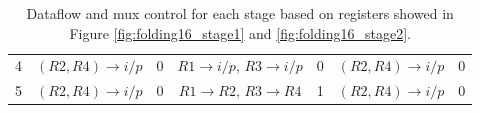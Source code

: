 \begin{table*}
{\begin{tabular}{c||c|c||c|c||c|c}
        \multirow{2}{*}{4}  &  \multirow{2}{*}{$(R2,R4) \to i/p$} & \multirow{2}{*}{0} & \multirow{2}{*}{$R1 \to i/p, \, R3 \to i/p$} &  \multirow{2}{*}{0}     &  \multirow{2}{*}{$(R2,R4) \to i/p$}                      &  \multirow{2}{*}{0}         \\  
                            &                                   &                        &                                   &                        &                 &                             \\ \hline
        \multirow{2}{*}{5}  & \multirow{2}{*}{$(R2,R4) \to i/p$} &  \multirow{2}{*}{0}    & \multirow{2}{*}{$R1 \to R2, \,R3 \to R4$}  &  \multirow{2}{*}{1}    &  \multirow{2}{*}{$(R2,R4) \to i/p$}     &  \multirow{2}{*}{0}        \\
                            &                                  &                        &                                     &                           &                        &                             \\ \hline    
    \end{tabular}}
    \caption{Dataflow and mux control for each stage based on registers showed in Figure \ref{fig:folding16_stage1} and
    \ref{fig:folding16_stage2}.}
        \label{tab:folding16_mux}
    \end{table*}